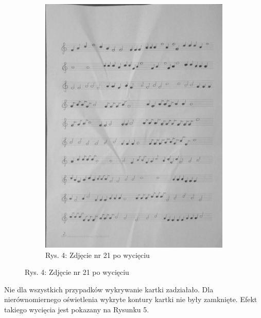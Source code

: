 \documentclass[11pt]{article}
\begin{document}
\begin{figure}
\begin{subfigure}[b]{0.475\textwidth}
        \label{fig2:sub1}
    \end{subfigure}
    \quad
    \begin{subfigure}[b]{0.475\textwidth}
        \centering
        \graphicspath{ {output/} }
        \includegraphics[width=.9\textwidth]{warped21_gray.jpg}
        \caption{Rys. 4: Zdjęcie nr 21 po wycięciu}
        \label{fig2:sub2}
    \end{subfigure}
    \label{fig2:secondExample}
\end{figure}

\FloatBarrier

\pagebreak


Nie dla wszystkich przypadków wykrywanie kartki zadziałało. Dla nierównomiernego oświetlenia wykryte kontury kartki nie były zamknięte. 
Efekt takiego wycięcia jest pokazany na Rysunku 5.
\end{document}
